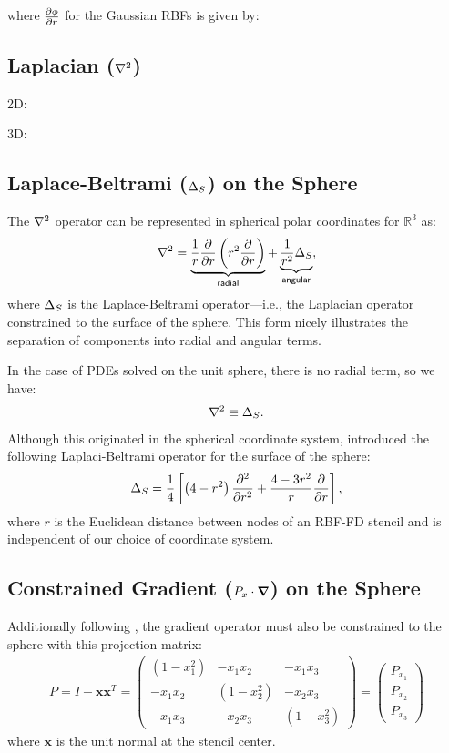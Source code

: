 \documentclass{report}
\begin{document}
{where $\frac{\partial \phi}{\partial r}$ for the Gaussian RBFs is given by: 


\subsection{Laplacian ($\Laplacian$)}

2D: 

3D: 

\subsection{Laplace-Beltrami ($\LaplaceBeltrami$) on the Sphere}

The $\Laplacian$ operator can be represented in spherical polar coordinates for $\mathbb{R}^3$ as: 
\begin{align} 
\nabla^2 = \underbrace{\frac{1}{r} \frac{\partial }{\partial r} \left( r^{2} \frac{\partial }{\partial r}  \right)}_{\mathsf{radial}} + \underbrace{\frac{1}{r^2} \Delta_{S}}_{\mathsf{angular}} , \label{eq:laplacian_in_spherical}
\end{align}
where $\LaplaceBeltrami$ is the Laplace-Beltrami operator---i.e., the Laplacian operator constrained to the surface of the sphere. This form nicely illustrates the separation of components into radial and angular terms. 

In the case of PDEs solved on the unit sphere, there is no radial term, so we have:
\begin{align}
\nabla^2 \equiv \Delta_S .
\end{align}
Although this originated in the spherical coordinate system, \cite{WrightFlyerYuen10} introduced the following Laplaci-Beltrami operator for the surface of the sphere: 
\begin{align} 
\Delta_S = \frac{1}{4} \left[ \left(4-r^2\right) \frac{\partial^2 }{\partial r^2} + \frac{4-3r^2}{r} \frac{\partial }{\partial r} \right],
\end{align} 
where $r$ is the Euclidean distance between nodes of an RBF-FD stencil and is independent of our choice of coordinate system. 

\subsection{Constrained Gradient ($P_{x} \cdot \grad$) on the Sphere}

Additionally following \cite{FlyerWright09, FlyerLehto11}, the gradient operator must also be constrained to the sphere with this projection matrix: 
\begin{align}
P = I - \mathbf{x} \mathbf{x}^T =  \begin{pmatrix} 
(1-x_1^2) & -x_1 x_2 & -x_1 x_3 \\
-x_1 x_2 & (1-x_2^2) & -x_2 x_3 \\ 
-x_1 x_3 & -x_2 x_3 & (1-x_3^2) 
\end{pmatrix} = \begin{pmatrix} P_{x_1} \\ P_{x_2} \\ P_{x_3} \end{pmatrix}
\label{eq:project_gradient}
\end{align}
where $\mathbf{x}$ is the unit normal at the stencil center. 


}
\end{document}
